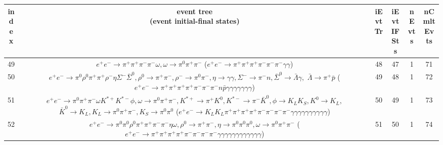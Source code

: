 \documentclass[landscape]{article}
\begin{document}
\begin{table}[htbp!]
\small
\centering
\begin{tabular}{|c|c|c|c|c|c|}
\hline
index & \thead{event tree \\ (event initial-final states)} & iEvtTr & iEvtIFSts & nEvts & nCmltEvts \\
\hline
49 & \makecell{ $ 
e^{+} e^{-} \rightarrow \pi^{+} \pi^{+} \pi^{-} \pi^{-} \omega ,
\omega \rightarrow \pi^{0} \pi^{+} \pi^{-} 
$ \\ ($
e^{+} e^{-} \rightarrow \pi^{+} \pi^{+} \pi^{+} \pi^{-} \pi^{-} \pi^{-} \gamma \gamma 
$) } & 48 & 47 & 1 & 71 \\
\hline
50 & \makecell{ $ 
e^{+} e^{-} \rightarrow \pi^{0} \rho^{0} \pi^{+} \pi^{+} \rho^{-} \eta \Sigma^{-} \bar{\Sigma}^{0} ,
\rho^{0} \rightarrow \pi^{+} \pi^{-} ,
\rho^{-} \rightarrow \pi^{0} \pi^{-} ,
\eta \rightarrow \gamma \gamma ,
\Sigma^{-} \rightarrow \pi^{-} n ,
\bar{\Sigma}^{0} \rightarrow \bar{\Lambda} \gamma ,
$ \\ $
\bar{\Lambda} \rightarrow \pi^{+} \bar{p} 
$ \\ ($
e^{+} e^{-} \rightarrow \pi^{+} \pi^{+} \pi^{+} \pi^{+} \pi^{-} \pi^{-} \pi^{-} n \bar{p} \gamma \gamma \gamma \gamma \gamma \gamma \gamma 
$) } & 49 & 48 & 1 & 72 \\
\hline
51 & \makecell{ $ 
e^{+} e^{-} \rightarrow \pi^{0} \pi^{+} \pi^{-} \omega K^{*+} K^{*-} \phi ,
\omega \rightarrow \pi^{0} \pi^{+} \pi^{-} ,
K^{*+} \rightarrow \pi^{+} K^{0} ,
K^{*-} \rightarrow \pi^{-} \bar{K}^{0} ,
\phi \rightarrow K_{L} K_{S} ,
K^{0} \rightarrow K_{L} ,
$ \\ $
\bar{K}^{0} \rightarrow K_{L} ,
K_{L} \rightarrow \pi^{0} \pi^{+} \pi^{-} ,
K_{S} \rightarrow \pi^{0} \pi^{0} 
$ \\ ($
e^{+} e^{-} \rightarrow K_{L} K_{L} \pi^{+} \pi^{+} \pi^{+} \pi^{+} \pi^{-} \pi^{-} \pi^{-} \pi^{-} \gamma \gamma \gamma \gamma \gamma \gamma \gamma \gamma \gamma \gamma 
$) } & 50 & 49 & 1 & 73 \\
\hline
52 & \makecell{ $ 
e^{+} e^{-} \rightarrow \pi^{0} \pi^{0} \rho^{0} \pi^{+} \pi^{+} \pi^{-} \pi^{-} \eta \omega ,
\rho^{0} \rightarrow \pi^{+} \pi^{-} ,
\eta \rightarrow \pi^{0} \pi^{0} \pi^{0} ,
\omega \rightarrow \pi^{0} \pi^{+} \pi^{-} 
$ \\ ($
e^{+} e^{-} \rightarrow \pi^{+} \pi^{+} \pi^{+} \pi^{+} \pi^{-} \pi^{-} \pi^{-} \pi^{-} \gamma \gamma \gamma \gamma \gamma \gamma \gamma \gamma \gamma \gamma \gamma \gamma 
$) } & 51 & 50 & 1 & 74 \\

\end{tabular}
\end{table}
\end{document}
